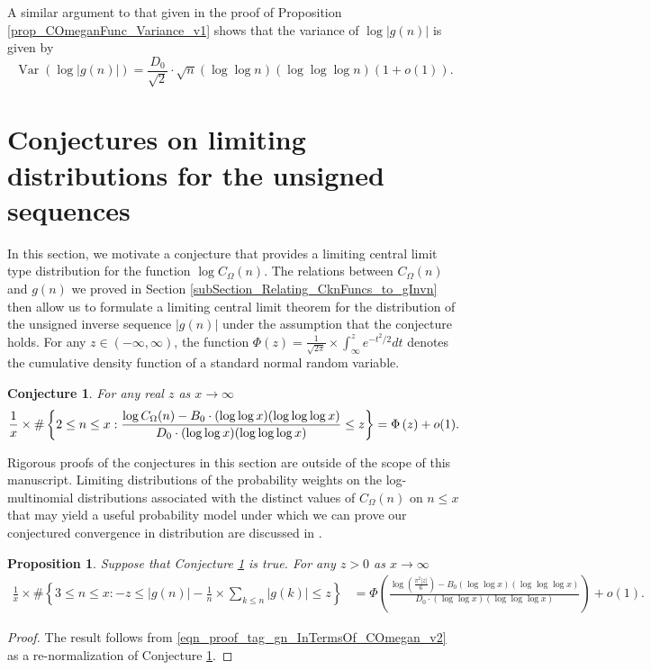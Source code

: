 \documentclass[11pt,reqno,a4letter]{article}
\newcommand{\hlocalref}[1]{\hyperref[#1]{\ref{#1}}}
\numberwithin{equation}{section}
\numberwithin{figure}{section}
\numberwithin{table}{section}
\let\citep\cite
\newcommand{\cf}{\textit{cf.\ }}
\theoremstyle{plain}
\newtheorem{conjecture}[theorem]{Conjecture}
\newtheorem{prop}[theorem]{Proposition}
\numberwithin{theorem}{section}
\theoremstyle{definition}
\begin{document}
A similar argument to that given in the proof of 
Proposition \hlocalref{prop_COmeganFunc_Variance_v1} 
shows that the variance of $\log |g(n)|$ is given by 
\[
\operatorname{Var}\left(\log |g(n)|\right) = \frac{D_0}{\sqrt{2}} \cdot 
     \sqrt{n} (\log\log n) (\log\log\log n) (1+o(1)). 
\]

\section{Conjectures on limiting distributions for the unsigned sequences} 
\label{subSection_ErdosKacTheorem_Analogs} 

In this section, we motivate a conjecture that provides a limiting 
central limit type distribution for the function $\log C_{\Omega}(n)$. 
The relations between $C_{\Omega}(n)$ and $g(n)$ we proved in 
Section \hlocalref{subSection_Relating_CknFuncs_to_gInvn} then 
allow us to formulate a limiting central limit theorem for the distribution 
of the unsigned inverse sequence $|g(n)|$ under the assumption that 
the conjecture holds. For any $z \in (-\infty, \infty)$, the function 
$\Phi(z) = \frac{1}{\sqrt{2\pi}} \times \int_{\infty}^{z} e^{-t^2/2} dt$ denotes the 
cumulative density function of a standard normal random variable. 

\begin{conjecture}
\label{conj_DetFormOfEKTypeThmForCOmegan_v1} 
For any real $z$ as $x \rightarrow \infty$ 
\begin{equation} 
\notag
\frac{1}{x} \times \#\left\{2 \leq n \leq x: 
	\frac{\log C_{\Omega}(n) - 
	B_0 \cdot (\log\log x) (\log\log\log x)}{D_0 \cdot (\log\log x)(\log\log\log x)} \leq z\right\} = 
     \Phi\left(z\right) + o(1). 
\end{equation}
\end{conjecture} 

Rigorous proofs of the conjectures in this section are outside of the scope of this manuscript. 
Limiting distributions of the probability weights on the log-multinomial distributions associated 
with the distinct values of $C_{\Omega}(n)$ on $n \leq x$ that may yield a useful probability 
model under which we can prove our conjectured convergence in distribution are discussed in 
\citep[\cf \S 1.2]{LOG-COMB-STRUCTS-BOOK}. 

\begin{prop}
\label{cor_CLT_VII} 
Suppose that Conjecture \hlocalref{conj_DetFormOfEKTypeThmForCOmegan_v1} is true. 
For any $z > 0$ as $x \rightarrow \infty$ 
\begin{align*} 
\frac{1}{x} \times \#\left\{3 \leq n \leq x: -z \leq |g(n)| - 
     \frac{1}{n} \times \sum_{k \leq n} |g(k)| \leq z\right\} & = 
	\Phi\left(\frac{\log\left(\frac{\pi^2 |z|}{6}\right)-B_0 (\log\log x) (\log\log\log x)}{ 
	D_0 \cdot (\log\log x)(\log\log\log x)}\right) + o(1).
\end{align*} 
\end{prop} 
\begin{proof} 
 
The result follows from \eqref{eqn_proof_tag_gn_InTermsOf_COmegan_v2} 
as a re-normalization of Conjecture \hlocalref{conj_DetFormOfEKTypeThmForCOmegan_v1}. 
\end{proof} 
\end{document}
